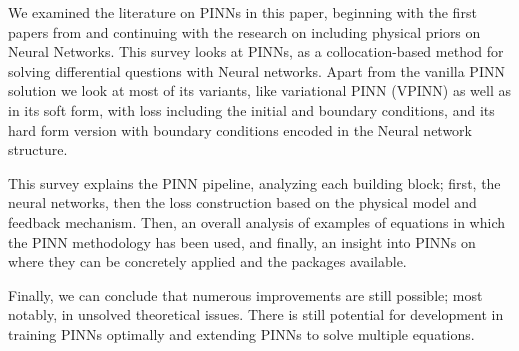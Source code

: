 \documentclass[pdflatex,sn-basic]{sn-jnl}%
\theoremstyle{thmstyleone}%
\theoremstyle{thmstyletwo}%
\theoremstyle{thmstylethree}%
\begin{document}


We examined the literature on PINNs in this paper, beginning with the first papers from \cite{Rai2017_PhysicsInformedDeep1_PerRPK,Rai2017_PhysicsInformedDeep2_PerRPK} and continuing with the research on including physical priors on Neural Networks.
%
This survey looks at PINNs, as a collocation-based method for solving differential questions with Neural networks.
Apart from the vanilla PINN solution we look at most of its variants, like variational PINN (VPINN) as well as in its soft form, with loss including the initial and boundary conditions, and its hard form version with boundary conditions encoded in the Neural network structure.


This survey explains the PINN pipeline, analyzing each building block; first, the neural networks, then the loss construction based on the physical model and feedback mechanism.
%
Then, an overall analysis of examples of equations in which the PINN methodology has been used, and finally, an insight into PINNs on where they can be concretely applied and the packages available.


%
Finally, we can conclude that
numerous improvements are still possible; most notably, in unsolved theoretical issues. There is still potential for development in training PINNs optimally and extending PINNs to solve multiple equations.
%














\end{document}

